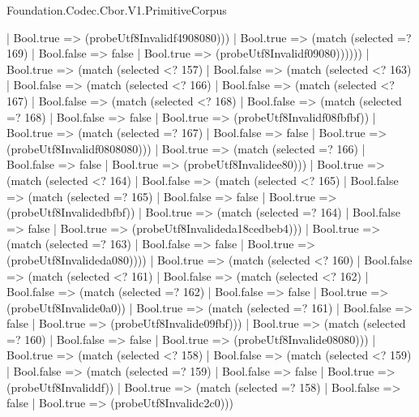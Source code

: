 \begin{lexlean}{Foundation.Codec.Cbor.V1.PrimitiveCorpus}
\begin{semanticmodule}
{                    | Bool.true => (probeUtf8Invalidf4908080)))
                | Bool.true => (match (selected =? 169)
                  | Bool.false => false
                  | Bool.true => (probeUtf8Invalidf09080))))))
        | Bool.true => (match (selected <? 157)
          | Bool.false => (match (selected <? 163)
            | Bool.false => (match (selected <? 166)
              | Bool.false => (match (selected <? 167)
                | Bool.false => (match (selected <? 168)
                  | Bool.false => (match (selected =? 168)
                    | Bool.false => false
                    | Bool.true => (probeUtf8Invalidf08fbfbf))
                  | Bool.true => (match (selected =? 167)
                    | Bool.false => false
                    | Bool.true => (probeUtf8Invalidf0808080)))
                | Bool.true => (match (selected =? 166)
                  | Bool.false => false
                  | Bool.true => (probeUtf8Invalidee80)))
              | Bool.true => (match (selected <? 164)
                | Bool.false => (match (selected <? 165)
                  | Bool.false => (match (selected =? 165)
                    | Bool.false => false
                    | Bool.true => (probeUtf8Invalidedbfbf))
                  | Bool.true => (match (selected =? 164)
                    | Bool.false => false
                    | Bool.true => (probeUtf8Invalideda18cedbeb4)))
                | Bool.true => (match (selected =? 163)
                  | Bool.false => false
                  | Bool.true => (probeUtf8Invalideda080))))
            | Bool.true => (match (selected <? 160)
              | Bool.false => (match (selected <? 161)
                | Bool.false => (match (selected <? 162)
                  | Bool.false => (match (selected =? 162)
                    | Bool.false => false
                    | Bool.true => (probeUtf8Invalide0a0))
                  | Bool.true => (match (selected =? 161)
                    | Bool.false => false
                    | Bool.true => (probeUtf8Invalide09fbf)))
                | Bool.true => (match (selected =? 160)
                  | Bool.false => false
                  | Bool.true => (probeUtf8Invalide08080)))
              | Bool.true => (match (selected <? 158)
                | Bool.false => (match (selected <? 159)
                  | Bool.false => (match (selected =? 159)
                    | Bool.false => false
                    | Bool.true => (probeUtf8Invaliddf))
                  | Bool.true => (match (selected =? 158)
                    | Bool.false => false
                    | Bool.true => (probeUtf8Invalidc2c0)))
}
\end{semanticmodule}
\end{lexlean}
